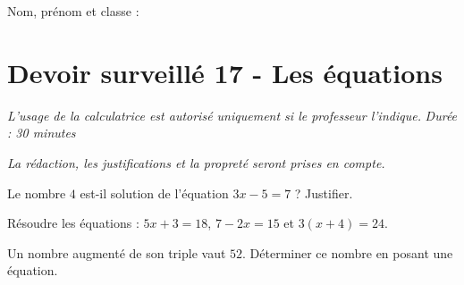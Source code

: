 \documentclass[a4paper,10pt]{report}
\begin{document}
\pagestyle{empty}
\noindent Nom, prénom et classe : \dotfill

\section*{Devoir surveillé 17 - Les équations}

\noindent \textit{L'usage de la calculatrice est autorisé uniquement si le professeur l'indique.} \hfill \textit{Durée : 30 minutes}

\medskip
\noindent \textit{La rédaction, les justifications et la propreté seront prises en compte.}


\begin{ex}[Tester]
Le nombre $4$ est-il solution de l'équation $3x-5=7$ ? Justifier.
\medskip\noindent\grandscarreaux{\linewidth}{2.5cm}
\end{ex}
\begin{ex}[Résoudre]
Résoudre les équations : $5x+3=18$, $7-2x=15$ et $3(x+4)=24$.
\medskip\noindent\grandscarreaux{\linewidth}{5cm}
\end{ex}
\begin{ex}[Problème]
Un nombre augmenté de son triple vaut $52$. Déterminer ce nombre en posant une équation.
\medskip\noindent\grandscarreaux{\linewidth}{4cm}
\end{ex}
\end{document}
